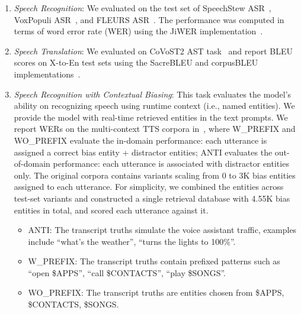 \begin{enumerate}
\itemsep 0in
    \item \textit{Speech Recognition}: We evaluated on the test set of SpeechStew ASR~\cite{chan2021speechstew}, VoxPopuli ASR~\cite{wang2021voxpopuli}, and FLEURS ASR~\cite{conneau2023fleurs}. The performance was computed in terms of word error rate (WER) using the JiWER implementation~\cite{morris2004and}.
    \item \textit{Speech Translation}: We evaluated on CoVoST2 AST task~\cite{wang2020covost} and report BLEU scores on X-to-En test sets using the SacreBLEU and corpusBLEU implementations~\cite{papineni2002bleu, post2018call}.

    \item \textit{Speech Recognition with Contextual Biasing}: This task evaluates the model's ability on recognizing speech using runtime context (i.e., named entities). We provide the model with real-time retrieved entities in the text prompts. We report WERs on the multi-context TTS corpora in~\cite{munkhdalai2023nam+}, where W\_PREFIX and WO\_PREFIX evaluate the in-domain performance: each utterance is assigned a correct bias entity + distractor entities; ANTI evaluates the out-of-domain performance: each utterance is associated with distractor entities only. The original corpora contains variants scaling from 0 to 3K bias entities assigned to each utterance. For simplicity, we combined the entities across test-set variants and constructed a single retrieval database with 4.55K bias entities in total, and scored each utterance against it. 

    \begin{itemize}
        \itemsep 0in
        \item ANTI: The transcript truths simulate the voice assistant traffic, examples include ``what’s the weather'', ``turns the lights to 100\%''. 
        \item W\_PREFIX: The transcript truths contain prefixed patterns such as ``open \$APPS'', ``call \$CONTACTS'', ``play \$SONGS''. 
        \item WO\_PREFIX: The transcript truths are entities chosen from \$APPS, \$CONTACTS, \$SONGS.  
    \end{itemize}  
    
\end{enumerate}

